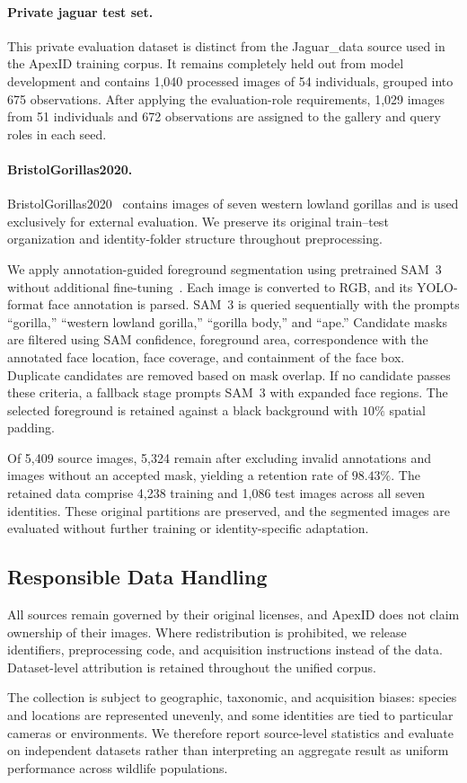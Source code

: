 \paragraph{Private jaguar test set.}
This private evaluation dataset is distinct from the
Jaguar\_data source used in the ApexID training corpus. It remains completely
held out from model development and contains 1,040 processed images of 54
individuals, grouped into 675 observations. After applying the evaluation-role
requirements, 1,029 images from 51 individuals and 672 observations are
assigned to the gallery and query roles in each seed.

\paragraph{BristolGorillas2020.}
\label{sec:dataset:bristol}
BristolGorillas2020~\cite{brookes2021bristolgorillas2020,brookes2021gorillas}
contains images of seven western lowland gorillas and is used exclusively for
external evaluation. We preserve its original train--test organization and
identity-folder structure throughout preprocessing.

We apply annotation-guided foreground segmentation using pretrained SAM~3
without additional fine-tuning~\cite{carion2025sam3}. Each image is converted to RGB,
and its YOLO-format face annotation is parsed. SAM~3 is queried sequentially
with the prompts ``gorilla,'' ``western lowland gorilla,'' ``gorilla body,''
and ``ape.'' Candidate masks are filtered using SAM confidence, foreground
area, correspondence with the annotated face location, face coverage, and
containment of the face box. Duplicate candidates are removed based on mask
overlap. If no candidate passes these criteria, a fallback stage prompts SAM~3
with expanded face regions. The selected foreground is retained against a
black background with $10\%$ spatial padding.

Of 5,409 source images, 5,324 remain after excluding invalid annotations and
images without an accepted mask, yielding a retention rate of $98.43\%$. The
retained data comprise 4,238 training and 1,086 test images across all seven
identities. These original partitions are preserved, and the segmented images
are evaluated without further training or identity-specific adaptation.

\subsection{Responsible Data Handling}
\label{sec:dataset:responsible}

All sources remain governed by their original licenses, and ApexID does not
claim ownership of their images. Where redistribution is prohibited, we
release identifiers, preprocessing code, and acquisition instructions instead
of the data. Dataset-level attribution is retained throughout the unified
corpus.

The collection is subject to geographic, taxonomic, and acquisition biases:
species and locations are represented unevenly, and some identities are tied
to particular cameras or environments. We therefore report source-level
statistics and evaluate on independent datasets rather than interpreting an
aggregate result as uniform performance across wildlife populations.
